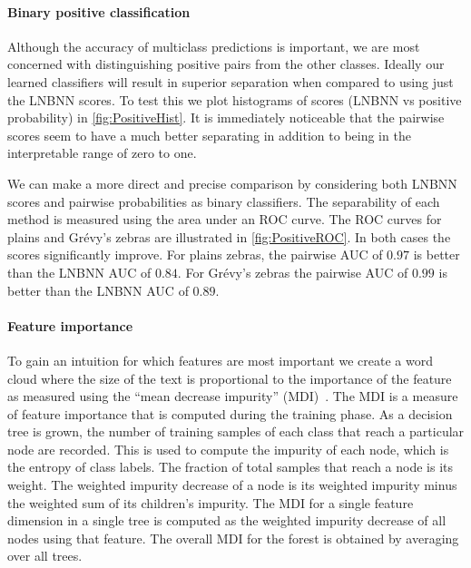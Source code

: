         \FloatBarrier{}
        \paragraph{Binary positive classification}
        Although the accuracy of multiclass predictions is important, we are most concerned with distinguishing
          positive pairs from the other classes.
        Ideally our learned classifiers will result in superior separation when compared to using just the LNBNN
          scores.
        To test this we plot histograms of scores (LNBNN vs positive probability) in \cref{fig:PositiveHist}.
        It is immediately noticeable that the pairwise scores seem to have a much better separating in addition
          to being in the interpretable range of zero to one.


        We can make a more direct and precise comparison by considering both LNBNN scores and pairwise
          probabilities as binary classifiers.
        The separability of each method is measured using the area under an ROC curve.
        The ROC curves for plains and Grévy's zebras are illustrated in \cref{fig:PositiveROC}.
        In both cases the scores significantly improve.
        For plains zebras, the pairwise AUC of $0.97$ is better than the LNBNN AUC of $0.84$.
        For Grévy's zebras the pairwise AUC of $0.99$ is  better than the LNBNN AUC of $0.89$.

        \PositiveHist{}

        \PositiveROC{}


        \paragraph{Feature importance}

        To gain an intuition for which features are most important we create a word cloud where the size of the
          text is proportional to the importance of the feature as measured using the ``mean decrease impurity''
          (MDI)~\cite{louppe2014understanding}.
        The MDI is a measure of feature importance that is computed during the training phase.
        As a decision tree is grown, the number of training samples of each class that reach a particular node
          are recorded.
        This is used to compute the impurity of each node, which is the entropy of class labels.
        The fraction of total samples that reach a node is its weight.
        The weighted impurity decrease of a node is its weighted impurity minus the weighted sum of its
          children's impurity.
        The MDI for a single feature dimension in a single tree is computed as the weighted impurity decrease of
          all nodes using that feature.
        The overall MDI for the forest is obtained by averaging over all trees.

